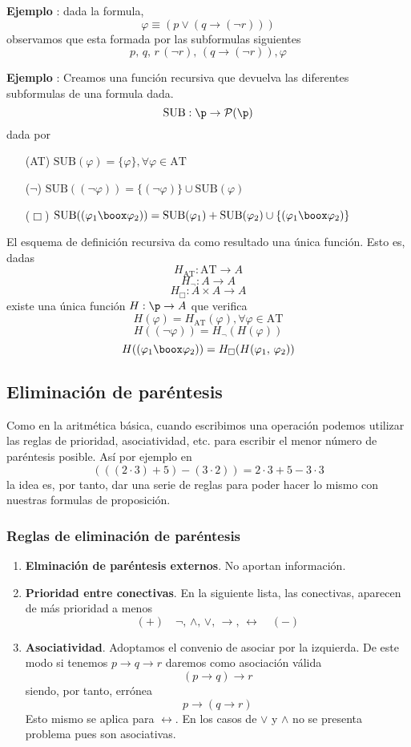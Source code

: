 \addtocounter{ej}{1} %
\textbf{Ejemplo }: dada la formula, 
\[ \varphi \equiv (p \lor (q \rightarrow (\neg r))) \]
observamos que esta formada por las subformulas siguientes
\[ p, \, q, \, r \, (\neg r), \, (q \rightarrow (\neg r)), \varphi \]
\addtocounter{ej}{1} %
\textbf{Ejemplo }: Creamos una función recursiva que devuelva las diferentes subformulas de una formula dada.
\[ \mbox{SUB}: \p \rightarrow \mathcal{P}(\p) \]
dada por 
\begin{itemize}
	\item[(AT)] $\mbox{SUB}(\varphi)=\{\varphi \}, \forall \varphi \in \mbox{AT}$
	\item[($\neg$)] $\mbox{SUB}((\neg \varphi))=\{ (\neg\varphi)\} \cup \mbox{SUB}(\varphi)$
	\item[($\Box$)] $ \mbox{SUB} ((\varphi_1 \boox \varphi_2) )= \mbox{SUB}(\varphi_1)+\mbox{SUB}(\varphi_2) \cup \{ (\varphi_1 \boox \varphi_2) \}$
\end{itemize}
\begin{prop} El esquema de definición recursiva da como resultado una única función. Esto es, dadas 
\[ H_{\mbox{AT}}: \mbox{AT} \rightarrow A \]
\[ H_{\lnot}: A \rightarrow A \]
\[ H_{\Box}: A \times A \rightarrow A \]
existe una única función $H: \p \rightarrow A$ que verifica 
\[ H(\varphi)=H_{\mbox{AT}}(\varphi), \forall \varphi \in \mbox{AT} \]
\[H((\neg \varphi))=H_{\neg}(H (\varphi))\]
\[H ( (\varphi_1 \boox \varphi_2) ) = H_{\Box}(H(\varphi_1, \, \varphi_2))\]
\end{prop}
\subsection{Eliminación de paréntesis}
Como en la aritmética básica, cuando escribimos una operación podemos utilizar las reglas de prioridad, asociatividad, etc. para escribir el menor número de paréntesis posible. Así por ejemplo en 
\[ (((2 \cdot 3)+5)-(3 \cdot 2))=2 \cdot 3 +5-3\cdot 3 \]
la idea es, por tanto, dar una serie de reglas para poder hacer lo mismo con nuestras formulas de proposición. 
\subsubsection{Reglas de eliminación de paréntesis}
\begin{enumerate}
	\item \textbf{Elminación de paréntesis externos}. No aportan información.
	\item \textbf{Prioridad entre conectivas}. En la siguiente lista, las conectivas, aparecen de más prioridad a menos
	\[ (+)\quad \neg, \, \wedge, \, \lor, \, \rightarrow, \, \leftrightarrow \quad (-) \]
	\item \textbf{Asociatividad}. Adoptamos el convenio de asociar por la izquierda. De este modo si tenemos $p \rightarrow q \rightarrow r$ daremos como asociación válida 
	\[ (p \rightarrow q) \rightarrow r \]
	siendo, por tanto, errónea 
	\[ p \rightarrow (q \rightarrow r)  \]
	Esto mismo se aplica para $\leftrightarrow$. En los casos de $\vee$ y $\wedge$ no se presenta problema pues son asociativas.
\end{enumerate}
